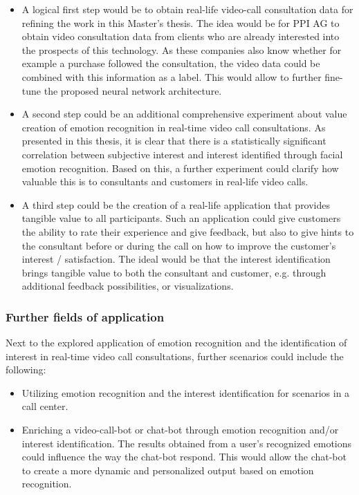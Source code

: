 \begin{itemize}
    \item A logical first step would be to obtain real-life video-call consultation data for refining the work in this Master's thesis. The idea would be for PPI AG to obtain video consultation data from clients who are already interested into the prospects of this technology. As these companies also know whether for example a purchase followed the consultation, the video data could be combined with this information as a label. This would allow to further fine-tune the proposed neural network architecture.
    \item A second step could be an additional comprehensive experiment about value creation of emotion recognition in real-time video call consultations. As presented in this thesis, it is clear that there is a statistically significant correlation between subjective interest and interest identified through facial emotion recognition. Based on this, a further experiment could clarify how valuable this is to consultants and customers in real-life video calls.
    \item A third step could be the creation of a real-life application that provides tangible value to all participants. Such an application could give customers the ability to rate their experience and give feedback, but also to give hints to the consultant before or during the call on how to improve the customer's interest / satisfaction. The ideal would be that the interest identification brings tangible value to both the consultant and customer, e.g. through additional feedback possibilities, or visualizations.
\end{itemize}

\subsubsection{Further fields of application}
Next to the explored application of emotion recognition and the identification of interest in real-time video call consultations, further scenarios could include the following:\newline
\begin{itemize}
    \item Utilizing emotion recognition and the interest identification for scenarios in a call center.
    \item Enriching a video-call-bot or chat-bot through emotion recognition and/or interest identification. The results obtained from a user's recognized emotions could influence the way the chat-bot respond. This would allow the chat-bot to create a more dynamic and personalized output based on emotion recognition.
\end{itemize}


